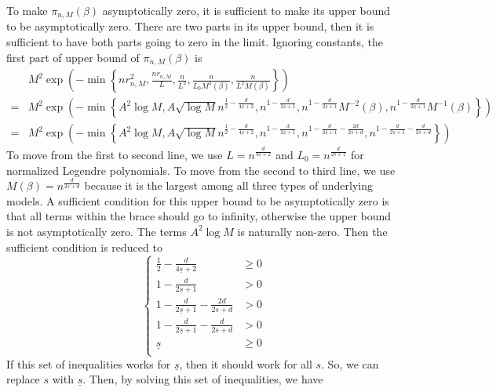         To make $\pi_{n,M}(\beta)$ asymptotically zero, it is sufficient to make its upper bound to be asymptotically zero. There are two parts in its upper bound, then it is sufficient to have both parts going to zero in the limit. Ignoring constants, the first part of upper bound of $\pi_{n,M}(\beta)$ is
        \begin{align*}
            &M^2\exp\left( -\min\left\{ nr_{n,M}^2, \frac{nr_{n,M}}{L}, \frac{n}{L^2}, \frac{n}{L_0M^2(\beta)},\frac{n}{L^2M(\beta)} \right\} \right)\\
            =& M^2 \exp\left( -\min\left\{ A^2\log M, A \sqrt{\log M} n^{\frac{1}{2}-\frac{d}{4\underline{s}+2}}, n^{1-\frac{d}{2\underline{s}+1}},n^{1-\frac{d}{2\underline{s}+1}}M^{-2}(\beta), n^{1-\frac{d}{2\underline{s}+1}}M^{-1}(\beta)\right\} \right)\\
            =& M^2 \exp\left( -\min\left\{ A^2\log M, A \sqrt{\log M} n^{\frac{1}{2}-\frac{d}{4\underline{s}+2}}, n^{1-\frac{d}{2\underline{s}+1}},n^{1-\frac{d}{2\underline{s}+1}-\frac{2d}{2s+d}}, n^{1-\frac{d}{2\underline{s}+1}-\frac{d}{2s+d}}\right\} \right)
        \end{align*}
        To move from the first to second line, we use $L=n^{\frac{d}{4\underline{s}+2}}$ and $L_0=n^{\frac{d}{2\underline{s}+1}}$ for normalized Legendre polynomials. To move from the second to third line, we use $M(\beta)=n^{\frac{d}{2s+d}}$ because it is the largest among all three types of underlying models. A sufficient condition for this upper bound to be asymptotically zero is that all terms within the brace should go to infinity, otherwise the upper bound is not asymptotically zero. The terms $A^2\log M$ is naturally non-zero. Then the sufficient condition is reduced to
        \[
        \left\{
            \begin{array}{cc}
                \frac{1}{2}-\frac{d}{4\underline{s}+2} & \ge0 \\
                1-\frac{d}{2\underline{s}+1} & >0 \\
                1-\frac{d}{2\underline{s}+1}-\frac{2d}{2s+d} & > 0\\
                1-\frac{d}{2\underline{s}+1}-\frac{d}{2s+d}& > 0\\
                \underline{s}&\ge0\\
            \end{array}
        \right.
        \]
        If this set of inequalities works for $\underline{s}$, then it should work for all $s$. So, we can replace $s$ with $\underline{s}$. Then, by solving this set of inequalities, we have
